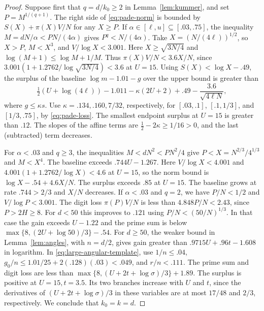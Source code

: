 \begin{proof}
Suppose first that \(q=d/k_0\ge2\) in Lemma~\ref{lem:kummer},
and set \(P=M^{1/(q+1)}\). The right side of
\eqref{eq:pade-norm} is bounded by \(S(X)+\pi(X)V/N\) for any
\(X\ge P\). If \(\alpha\in[\ell,u]\subseteq[.03,.75]\),
the inequality \(M=dN/\alpha<PN/(4\alpha)\) gives
\(P^q<N/(4\alpha)\). Take \(X=(N/(4\ell))^{1/2}\), so
\(X>P\), \(M<X^3\), and \(V/\log X<3.001\).
Here \(X\ge\sqrt{3N/4}\) and
\(\log(M+1)\le\log M+1/M\). Thus
\(\pi(X)V/N<3.6X/N\), since
\(3.001(1+1.2762/\log\sqrt{3N/4})<3.6\) at \(U=15\).
Using \(S(X)<\log X-.49\), the surplus of the baseline
\(\log m-1.01-g\) over the upper bound is greater than
\[
 \tfrac12(U+\log(4\ell))-1.011-\kappa(2U+2)+.49
                  -\frac{3.6}{\sqrt{4\ell N}},
\]
where \(g\le\kappa s\). Use \(\kappa=.134,.160,7/32\),
respectively, for \([.03,.1]\), \([.1,1/3]\), and
\([1/3,.75]\), by \eqref{eq:pade-loss}.
The smallest endpoint surplus at \(U=15\) is greater than
\(.12\). The slopes of the affine terms are
\(\tfrac12-2\kappa\ge1/16>0\), and the last (subtracted)
term decreases.

For \(\alpha<.03\) and \(q\ge3\), the inequalities
\(M<dN^2<PN^2/4\) give \(P<X=N^{2/3}/4^{1/3}\)
and \(M<X^4\). The baseline exceeds \(.744U-1.267\).
Here \(V/\log X<4.001\) and
\(4.001(1+1.2762/\log X)<4.6\) at \(U=15\), so the norm
bound is \(\log X-.54+4.6X/N\).
The surplus exceeds \(.85\) at \(U=15\). The baseline grows
at rate \(.744>2/3\) and \(X/N\) decreases.
If \(\alpha<.03\) and \(q=2\), we have \(P/N<1/2\) and
\(V/\log P<3.001\). The digit loss \(\pi(P)V/N\) is less
than \(4.848P/N<2.43\), since \(P>2H\ge8\).
For \(d<50\) this improves to \(.121\) using
\(P/N<(50/N)^{1/3}\). In that case the gain exceeds \(U-1.22\)
and the prime sum is below
\(\max\{8,(2U+\log50)/3\}-.54\). For \(d\ge50\), the
weaker bound in Lemma~\ref{lem:angles}, with \(n=d/2\),
gives gain greater than \(.9715U+.96t-1.608\) in logarithm.
In \eqref{eq:large-angular-template}, use \(1/n\le.04\),
\(g_0/n\le1.01/25+2(.128)(.03)<.049\), and \(r/n<.111\).
The prime sum and digit loss are less than
\(\max\{8,(U+2t+\log\sigma)/3\}+1.89\).
The surplus is positive at \(U=15,t=3.5\).
Its two branches increase with \(U\) and \(t\), since the
derivatives of \((U+2t+\log\sigma)/3\) in these variables
are at most \(17/48\) and \(2/3\), respectively. We conclude that \(k_0=k=d\).


\end{proof}
